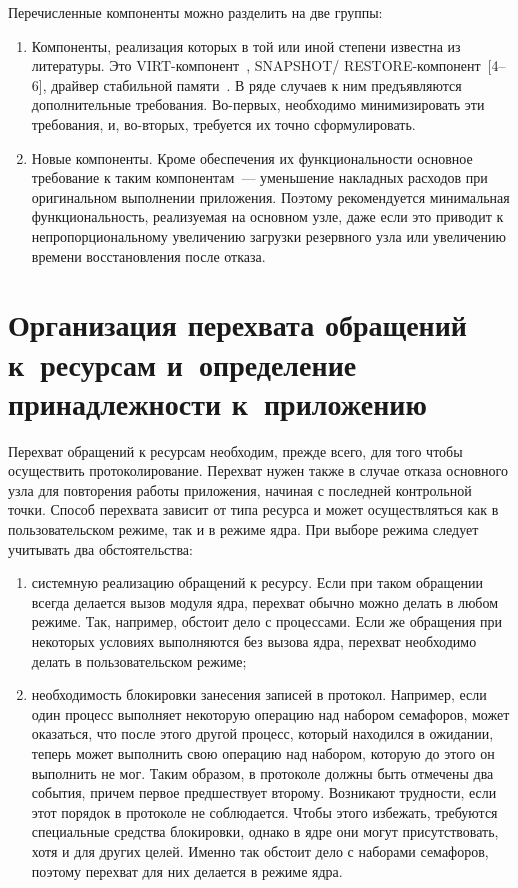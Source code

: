 \begin{multicols}{2}
Перечисленные компоненты можно разделить на две группы:
\begin{enumerate}[1.]
\item Компоненты, реализация которых в той или иной степени известна из
литературы. Это VIRT-компонент~\cite{10zak, 11zak},
SNAPSHOT/ RESTORE-компонент~[4--6], драйвер стабильной
памяти~\cite{12zak}. В ряде случаев к ним предъявляются дополнительные
требования. Во-первых, необходимо минимизировать эти требования, и,
во-вторых, требуется их точно сформулировать.
\item Новые компоненты. Кроме обеспечения их функциональности
основное требование к таким компонентам~--- уменьшение накладных
расходов при оригинальном выполнении приложения. Поэтому рекомендуется
минимальная функциональность, реа\-ли\-зу\-емая на основном узле, даже если это
приводит к непропорциональному увеличению загрузки резервного узла или
увеличению времени восстановления после отказа.
\end{enumerate}

\vspace*{-6pt}
\section{Организация перехвата обращений к~ресурсам
и~определение принадлежности к~приложению}

Перехват обращений к ресурсам необходим, прежде всего, для того чтобы
осуществить протоколирование. Перехват нужен также в случае отказа основного 
узла для повторения работы приложения, начиная с последней контрольной точки.  
Способ перехвата зависит от типа ресурса и может осуществляться как в 
пользовательском режиме, так и в режиме ядра. При выборе режима следует 
учитывать два обстоятельства:
\begin{enumerate}[(1)]
\item системную реализацию обращений к ресурсу. Если при таком обращении всегда
делается вызов модуля ядра, перехват обычно можно делать в любом режиме. Так, например,
обстоит дело с процессами.  Если же обращения при некоторых условиях выполняются без
вызова ядра, перехват необходимо делать в пользовательском режиме;
{ %

}
\item необходимость блокировки занесения записей в протокол. Например,
если один процесс выполняет некоторую операцию над набором семафоров, может 
оказаться, что после этого другой процесс, который находился в ожидании, теперь 
может выполнить свою операцию над набором, которую до этого он выполнить не 
мог. Таким образом, в протоколе должны быть отмечены два события, причем первое 
предшествует второму. Возникают трудности, если этот порядок в протоколе не 
соблюдается. Чтобы этого избежать, требуются специальные средства блокировки, 
однако в ядре они могут присутствовать, хотя и для других целей. Именно так 
обстоит дело с наборами семафоров, поэтому перехват для них делается в режиме 
ядра. 
{%

}
\end{enumerate}
\end{multicols}
